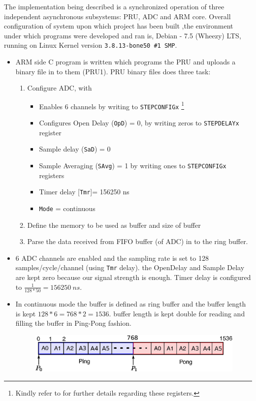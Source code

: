 The implementation being described is a synchronized operation of three independent asynchronous subsystems: PRU, ADC and ARM core. Overall configuration of system upon which project has been built ,the environment under which programs were developed and ran is, Debian - 7.5 (Wheezy) LTS, running on Linux Kernel version \texttt{3.8.13-bone50 \#1 SMP}. 

\begin{itemize}
	\item ARM side C program is written which programs the PRU and uploads a binary file in to them (PRU1). PRU binary files does three task:
	\begin{enumerate}
		\item Configure ADC, with 
		\begin{itemize}
			\item Enables 6 channels by writing to \texttt{STEPCONFIGx} \footnote{Kindly refer to \cite{AM3358TRM} for further details regarding these registers.}
			\item Configures Open Delay (\texttt{OpD}) = 0, by writing zeros to \texttt{STEPDELAYx} register  
			\item Sample delay (\texttt{SaD}) = 0 
			\item Sample Averaging (\texttt{SAvg}) = 1  by writing ones to  \texttt{STEPCONFIGx} registers
			\item Timer delay [\texttt{Tmr}]= 156250 ns
			\item \texttt{Mode} = continuous 
		\end{itemize}
		\item Define the memory to be used as buffer and size of buffer
		\item Parse the data received from FIFO buffer (of ADC) in to the ring buffer. 
	\end{enumerate}
	\item 6 ADC channels are enabled and the sampling rate is set to 128 samples/cycle/channel (using \texttt{Tmr} delay). the OpenDelay and Sample Delay are kept zero because our signal strength is enough. Timer delay is configured to $ \frac{1}{128 * 50} = 156250 ~ns $.
	\item In continuous mode the buffer is defined as ring buffer and the   buffer length is kept $ 128 * 6 = 768 * 2 = 1536 $. buffer length is kept double for reading and filling the buffer in Ping-Pong fashion.  
	\begin{figure}[h]
		\includegraphics[width=\textwidth]{fig/ring_buffer.eps}

\end{figure}
\end{itemize}
